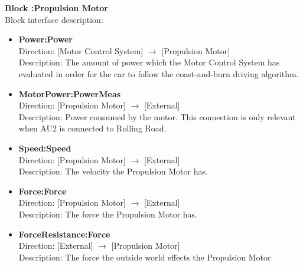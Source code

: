 \textbf{Block :Propulsion Motor}\\
Block interface description:
\begin{itemize}
	\item \textbf{Power:Power}\\
	Direction: [Motor Control System] $\rightarrow$ [Propulsion Motor]\\
	Description: The amount of power which the Motor Control System has evaluated in order for the car to follow the coast-and-burn driving algorithm.
	\item \textbf{MotorPower:PowerMeas}\\
	Direction: [Propulsion Motor] $\rightarrow$ [External]\\
	Description: Power consumed by the motor. This connection is only relevant when AU2 is connected to Rolling Road.
	\item \textbf{Speed:Speed}\\
	Direction: [Propulsion Motor] $\rightarrow$ [External]\\
	Description: The velocity the Propulsion Motor has.
	\item \textbf{Force:Force}\\
	Direction: [Propulsion Motor] $\rightarrow$ [External]\\
	Description: The force the Propulsion Motor has.
	\item \textbf{ForceResistance:Force}\\
	Direction: [External] $\rightarrow$ [Propulsion Motor]\\
	Description: The force the outside world effects the Propulsion Motor.
\end{itemize}

